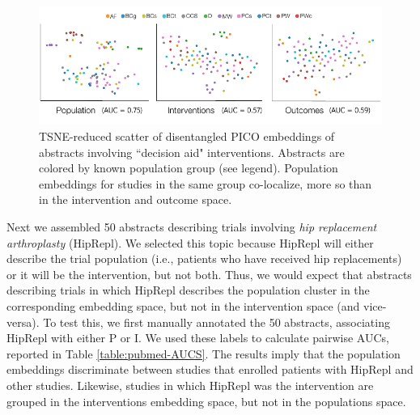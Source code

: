 \documentclass[11pt,a4paper]{article}
\begin{document}
\begin{figure}
\includegraphics[width=\linewidth]{figures/decisionaidsauc.pdf}
\vspace{-2em}
\caption{TSNE-reduced scatter of disentangled PICO embeddings of abstracts involving ``decision aid" interventions. Abstracts are colored by known population group (see legend). Population embeddings for studies in the same group co-localize, more so than in the intervention and outcome space.}
\label{figure:DATSNE}
\vspace{-.75em}
\end{figure}


Next we assembled 50 abstracts describing trials involving \emph{hip replacement arthroplasty} (HipRepl). We selected this topic because HipRepl will either describe the trial population (i.e., patients who have received hip replacements) or it will be the intervention, but not both. Thus, we would expect that abstracts describing trials in which HipRepl describes the population cluster in the corresponding embedding space, but not in the intervention space (and vice-versa). To test this, we first manually annotated the 50 abstracts, associating HipRepl with either P or I. We used these labels to calculate pairwise AUCs, reported in Table \ref{table:pubmed-AUCS}. The results imply that the population embeddings discriminate between studies that enrolled patients with HipRepl and other studies. Likewise, studies in which HipRepl was the intervention are grouped in the interventions embedding space, but not in the populations space. 
\end{document}
